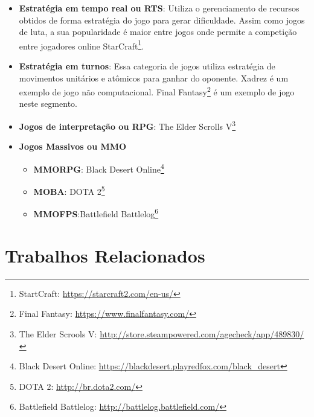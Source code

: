 \begin{itemize}
\begin{itemize}
    \end{itemize}
  \item \textbf{Estratégia em tempo real ou \ac{RTS}}: Utiliza o gerenciamento de recursos obtidos de forma estratégia do jogo para gerar dificuldade. Assim como jogos de luta, a sua popularidade é maior entre jogos onde permite a competição entre jogadores online StarCraft\footnote{StartCraft: \url{https://starcraft2.com/en-us/}}.
  \item \textbf{Estratégia em turnos}: Essa categoria de jogos utiliza estratégia de movimentos unitários e atômicos para ganhar do oponente. Xadrez é um exemplo de jogo não computacional. Final Fantasy\footnote{Final Fantasy: \url{https://www.finalfantasy.com/}} é um exemplo de jogo neste segmento.
  \item \textbf{Jogos de interpretação ou \ac{RPG}}: The Elder Scrolls V\footnote{The Elder Scrools V: \url{http://store.steampowered.com/agecheck/app/489830/}}
  \item \textbf{Jogos Massivos ou \ac{MMO}}
    \begin{itemize}
      \item \textbf{\ac{MMORPG}}: Black Desert Online\footnote{Black Desert Online: \url{https://blackdesert.playredfox.com/black_desert}}
      \item \textbf{\ac{MOBA}}: DOTA 2\footnote{DOTA 2: \url{http://br.dota2.com/}}
      \item \textbf{\ac{MMOFPS}}:Battlefield Battlelog\footnote{Battlefield Battlelog: \url{http://battlelog.battlefield.com/}}
    \end{itemize}
\end{itemize}

\section{Trabalhos Relacionados}
\label{sec:similares}
